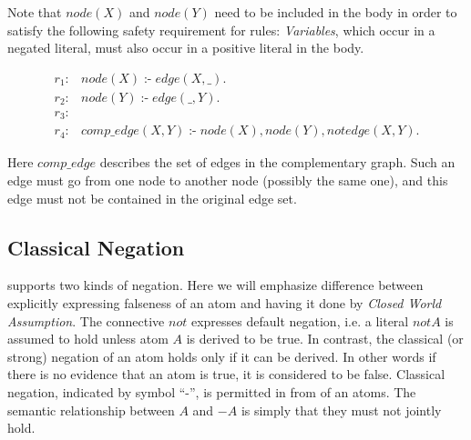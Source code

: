 \documentclass[14pt,a4paper, titlepage]{article}
\DeclareMathOperator{\leftimpl}{:-}
\begin{document}
Note that $\mathit{node}(X)$ and $\mathit{node}(Y)$ need to be included in the body in order to satisfy the following safety requirement for rules: \emph{Variables}, which occur in a negated literal, must also occur in a positive literal in the body.
\begin{exmp}
\begin{align*}
r_1\colon& \mathit{node}(X) \leftimpl \mathit{edge}(X, \_).\\
r_2\colon& \mathit{node}(Y) \leftimpl \mathit{edge}(\_, Y). \\
r_3\colon& \\
r_4\colon& \mathit{comp\_edge}(X, Y) \leftimpl \mathit{node}(X), \mathit{node}(Y), \mathit{ not } \mathit{ edge }(X, Y). 
\end{align*}
\end{exmp}
Here $\mathit{comp\_edge}$ describes the set of edges in the complementary graph. Such an edge must go from one node to another node (possibly the same one), and this edge must not be contained in the original edge set. 

\subsection{Classical Negation}
\dlvhex{} supports two kinds of negation. Here we will emphasize difference between explicitly expressing falseness of an atom and having it done by \emph{Closed World Assumption}. The connective $\mathit{not}$ expresses default negation, i.e. a literal $\mathit{not}A$ is assumed to hold unless atom $A$ is derived to be true. In contrast, the classical (or strong) negation of an atom holds only if it can be derived. In other words if there is no evidence that an atom is true, it is considered to be false. Classical negation, indicated by symbol \enquote{-}, is permitted in from of an atoms. The semantic relationship between $A$ and $-A$ is simply that they must not jointly hold.
\end{document}
